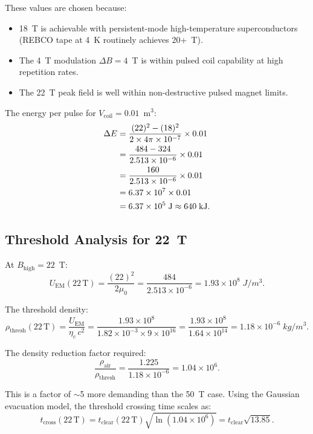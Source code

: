 \documentclass[amsmath,amssymb,aps,prd,superscriptaddress,nofootinbib]{revtex4-2}
\newcommand{\etac}{\eta_c}
\begin{document}
These values are chosen because:
\begin{itemize}
\item 18~T is achievable with persistent-mode high-temperature
  superconductors (REBCO tape at 4~K routinely achieves 20+~T).
\item The 4~T modulation $\Delta B = 4$~T is within pulsed coil
  capability at high repetition rates.
\item The 22~T peak field is well within non-destructive pulsed
  magnet limits.
\end{itemize}

The energy per pulse for $V_\text{coil} = 0.01$~m$^3$:
\begin{align}
\Delta E &= \frac{(22)^2 - (18)^2}{2 \times 4\pi \times 10^{-7}} \times 0.01 \notag \\
&= \frac{484 - 324}{2.513 \times 10^{-6}} \times 0.01 \notag \\
&= \frac{160}{2.513 \times 10^{-6}} \times 0.01 \notag \\
&= 6.37 \times 10^{7} \times 0.01 \notag \\
&= 6.37 \times 10^{5} \; \si{J} \approx 640 \; \si{kJ}.
\end{align}

\subsection{Threshold Analysis for 22~T}

At $B_\text{high} = 22$~T:
\begin{equation}
U_\text{EM}(22\,\text{T}) = \frac{(22)^2}{2\mu_0}
= \frac{484}{2.513 \times 10^{-6}}
= 1.93 \times 10^{8} \; \si{J/m^3}.
\end{equation}

The threshold density:
\begin{equation}
\rho_\text{thresh}(22\,\text{T})
= \frac{U_\text{EM}}{\etac \, c^2}
= \frac{1.93 \times 10^8}{1.82 \times 10^{-3} \times 9 \times 10^{16}}
= \frac{1.93 \times 10^8}{1.64 \times 10^{14}}
= 1.18 \times 10^{-6} \; \si{kg/m^3}.
\end{equation}

The density reduction factor required:
\begin{equation}
\frac{\rho_\text{air}}{\rho_\text{thresh}} = \frac{1.225}{1.18 \times 10^{-6}}
= 1.04 \times 10^{6}.
\end{equation}

This is a factor of $\sim$5 more demanding than the 50~T case. Using
the Gaussian evacuation model, the threshold crossing time scales as:
\begin{equation}
t_\text{cross}(22\,\text{T}) = t_\text{clear}(22\,\text{T}) \sqrt{\ln(1.04 \times 10^6)}
= t_\text{clear} \sqrt{13.85}.
\end{equation}
\end{document}
